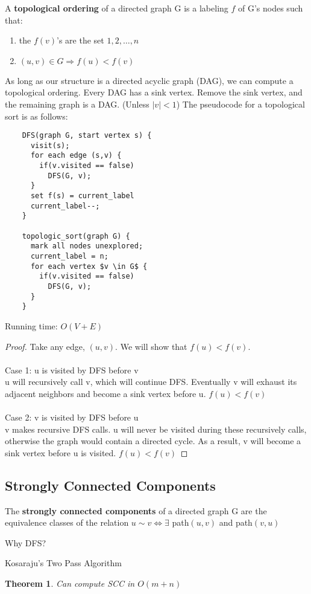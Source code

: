 \documentclass[]{book}
\begin{document}
  A \textbf{topological ordering} of a directed graph G
  is a labeling $f$ of G's nodes such that:
  \begin{enumerate}
    \item the $f(v)$'s are the set ${1,2,\ldots, n}$
    \item $(u,v) \in G \Rightarrow f(u) < f(v)$
  \end{enumerate}

  As long as our structure is a directed acyclic graph (DAG), we can compute a topological ordering.
  Every DAG has a sink vertex. Remove the sink vertex, and the remaining graph is a DAG. (Unless
  $|v| < 1$) The pseudocode for a topological sort is as follows:
  \begin{verbatim}
    DFS(graph G, start vertex s) {
      visit(s);
      for each edge (s,v) {
        if(v.visited == false)
          DFS(G, v);
      }
      set f(s) = current_label
      current_label--;
    }

    topologic_sort(graph G) {
      mark all nodes unexplored;
      current_label = n;
      for each vertex $v \in G$ {
        if(v.visited == false)
          DFS(G, v);
      }
    }
  \end{verbatim}
  Running time: $O(V+E)$
  \begin{proof}
    Take any edge, $(u,v)$. We will show that $f(u) < f(v)$.\\\\
    \indent Case 1: u is visited by DFS before v\\
    u will recursively call v, which will continue DFS. Eventually v will exhaust
    its adjacent neighbors and become a sink vertex before u. $f(u) < f(v)$\\\\
    \indent Case 2: v is visited by DFS before u\\
    v makes recursive DFS calls. u will never be visited during these recursively calls,
    otherwise the graph would contain a directed cycle. As a result, v will become a sink
    vertex before u is visited. $f(u) < f(v)$
  \end{proof}

  \subsection*{Strongly Connected Components}
  The \textbf{strongly connected components} of a directed graph G are the
  equivalence classes of the relation $u\sim v \Leftrightarrow \exists$ path$(u,v)$ and
  path$(v,u)$

  Why DFS?

  Kosaraju's Two Pass Algorithm
  \newtheorem{Kosaraju}{Theorem}[section]
  \begin{Kosaraju}
    Can compute SCC in $O(m+n)$
  \end{Kosaraju}



  \backmatter
  \appendix
  \printindex
\end{document}
